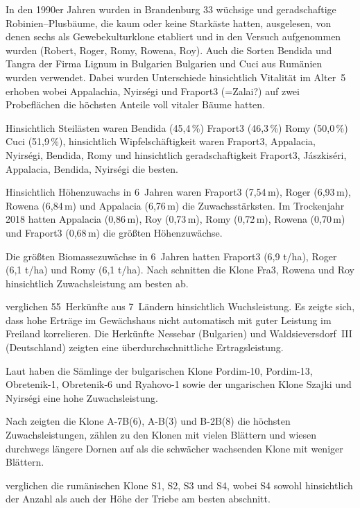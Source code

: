 \documentclass[twocolumn]{scrartcl}
\begin{document}
In den 1990er Jahren wurden in Brandenburg 33 wüchsige und
geradschaftige Robinien--Plusbäume, die kaum oder keine Starkäste
hatten, ausgelesen, von denen sechs als Gewebekulturklone etabliert
und in den Versuch aufgenommen wurden (Robert, Roger, Romy, Rowena,
Roy). Auch die Sorten Bendida und Tangra der Firma Lignum in Bulgarien
Bulgarien und Cuci aus Rumänien wurden verwendet. Dabei wurden
Unterschiede hinsichtlich Vitalität im Alter~5 erhoben wobei
Appalachia, Nyirségi und Fraport3 (=Zalai?) auf zwei Probeflächen die
höchsten Anteile voll vitaler Bäume hatten.

Hinsichtlich Steilästen waren Bendida (45,4\,\%) Fraport3 (46,3\,\%)
Romy (50,0\,\%) Cuci (51,9\,\%), hinsichtlich Wipfelschäftigkeit waren
Fraport3, Appalacia, Nyirségi, Bendida, Romy und hinsichtlich
geradschaftigkeit Fraport3, Jászkiséri, Appalacia, Bendida, Nyirségi
die besten.

Hinsichtlich Höhenzuwachs in 6~Jahren waren Fraport3 (7,54\,m), Roger
(6,93\,m), Rowena (6,84\,m) und Appalacia (6,76\,m) die
Zuwachsstärksten. Im Trockenjahr 2018 hatten Appalacia (0,86\,m), Roy
(0,73\,m), Romy (0,72\,m), Rowena (0,70\,m) und Fraport3 (0,68\,m) die
größten Höhenzuwächse.

Die größten Biomassezuwächse in 6~Jahren hatten Fraport3 (6,9 t/ha),
Roger (6,1 t/ha) und Romy (6,1 t/ha). Nach
\citet{loeffler2017fastwood} schnitten die Klone Fra3, Rowena und Roy
hinsichtlich Zuwachsleistung am besten ab.

\citet{guse2015robinie} verglichen 55~Herkünfte aus 7~Ländern
hinsichtlich Wuchsleistung. Es zeigte sich, dass hohe Erträge im
Gewächshaus nicht automatisch mit guter Leistung im Freiland
korrelieren. Die Herkünfte Nessebar (Bulgarien) und
Waldsieversdorf~III (Deutschland) zeigten eine überdurchschnittliche
Ertragsleistung.

Laut \citet{dimitrova2024robinie} haben die Sämlinge der bulgarischen
Klone Pordim-10, Pordim-13, Obretenik-1, Obretenik-6 und Ryahovo-1
sowie der ungarischen Klone Szajki und Nyirségi eine hohe
Zuwachsleistung.

Nach \citet{diniPapanastasi2004robinie} zeigten die Klone A-7B(6),
A-B(3) und B-2B(8) die höchsten Zuwachsleistungen, zählen zu den
Klonen mit vielen Blättern und wiesen durchwegs längere Dornen auf als
die schwächer wachsenden Klone mit weniger Blättern.

\citet{budaeu2023robinie} verglichen die rumänischen Klone S1, S2, S3
und S4, wobei S4 sowohl hinsichtlich der Anzahl als auch der Höhe der
Triebe am besten abschnitt.
\end{document}
